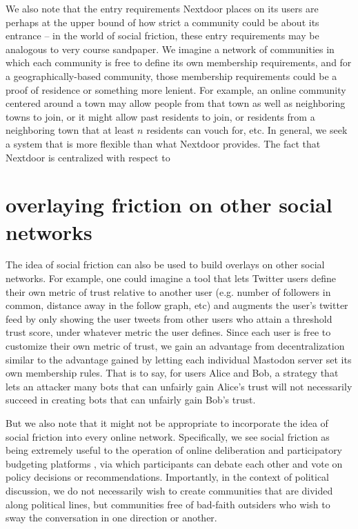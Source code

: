\documentclass[sigconf,authordraft]{acmart}
\begin{document}
We also note that the entry requirements Nextdoor places on its users are perhaps at the upper bound of how strict a community could be about its entrance -- in the world of social friction, these entry requirements may be analogous to very course sandpaper. We imagine a network of communities in which each community is free to define its own membership requirements, and for a geographically-based community, those membership requirements could be a proof of residence or something more lenient. For example, an online community centered around a town may allow people from that town as well as neighboring towns to join, or it might allow past residents to join, or residents from a neighboring town that at least $n$ residents can vouch for, etc. In general, we seek a system that is more flexible than what Nextdoor provides. The fact that Nextdoor is centralized with respect to  

\section{overlaying friction on other social networks}

The idea of social friction can also be used to build overlays on other social networks. For example, one could imagine a tool that lets Twitter users define their own metric of trust relative to another user (e.g. number of followers in common, distance away in the follow graph, etc) and augments the user's twitter feed by only showing the user tweets from other users who attain a threshold trust score, under whatever metric the user defines. Since each user is free to customize their own metric of trust, we gain an advantage from decentralization similar to the advantage gained by letting each individual Mastodon server set its own membership rules. That is to say, for users Alice and Bob, a strategy that lets an attacker many bots that can unfairly gain Alice's trust will not necessarily succeed in creating bots that can unfairly gain Bob's trust.

But we also note that it might not be appropriate to incorporate the idea of social friction into every online network. Specifically, we see social friction as being extremely useful to the operation of online deliberation \cite{semaan2015designing} and participatory budgeting platforms \cite{de1998participatory,shah2007participatory,wampler2010participatory,cabannes2004participatory}, via which participants can debate each other and vote on policy decisions or recommendations. Importantly, in the context of political discussion, we do not necessarily wish to create communities that are divided along political lines, but communities free of bad-faith outsiders who wish to sway the conversation in one direction or another. 
\end{document}
